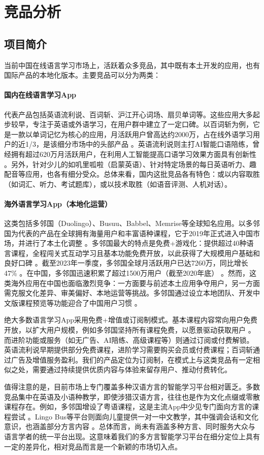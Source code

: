 \section{竞品分析}
\subsection{项目简介}
当前中国在线语言学习市场上，活跃着众多竞品，其中既有本土开发的应用，也有国际产品的本地化版本。主要竞品可以分为两类：
\paragraph{国内在线语言学习App}
代表产品包括英语流利说、百词斩、沪江开心词场、扇贝单词等。这些应用大多起步较早，专注于英语或外语学习，在用户群中建立了一定口碑。以百词斩为例，它是一款以单词记忆为核心的应用，月活跃用户曾高达约2000万，占在线外语学习用户的近1/3，是该细分市场中的头部产品 。英语流利说则主打AI智能口语陪练，曾经拥有超过620万月活跃用户，在利用人工智能提高口语学习效果方面具有创新性 。另外，针对少儿的如叽里呱啦（启蒙英语）、针对特定场景的每日英语听力、趣配音等应用，也各有细分受众。总体来看，国内这批竞品各有特色：或以内容取胜（如词汇、听力、考试题库），或以技术取胜（如语音评测、人机对话）。
\paragraph{海外语言学习App（本地化运营）}
这类包括多邻国（Duolingo）、Busuu、Babbel、Memrise等全球知名应用。以多邻国为代表的产品在全球拥有海量用户和丰富语种课程，它于2019年正式进入中国市场，并进行了本土化调整  。多邻国最大的特点是免费+游戏化：提供超过40种语言课程，全程闯关式互动学习且基本功能免费开放，以此获得了大规模用户基础和良好口碑  。截至2023年一季度，多邻国全球月活跃用户已达7260万，同比增长47\% 。在中国，多邻国迅速积累了超过1500万用户（截至2020年底） 。然而，这类海外应用在中国也面临激烈竞争：一方面要与前述本土应用争夺用户，另一方面需克服文化差异、审美偏好、本地运营等挑战。多邻国通过设立本地团队、开发中文版课程预览等功能迎合了中国用户习惯 。

绝大多数语言学习App采用免费+增值或订阅制模式。基本课程内容常向用户免费开放，以扩大用户规模，例如多邻国坚持所有课程免费，以愿景驱动获取用户 。而进阶功能或服务（如无广告、AI陪练、高级课程等）则通过订阅或付费解锁。英语流利说早期提供部分免费课程，进阶学习需要购买会员或付费课程；百词斩通过广告及增值服务盈利。我们的产品定位为订阅制，在模式上与这类竞品有一定相似之处，需要通过持续提供优质内容与体验来留存用户、推动付费转化。

值得注意的是，目前市场上专门覆盖多种汉语方言的智能学习平台相对匮乏。多数竞品集中在英语及小语种教学，即使涉猎汉语方言，往往也是作为文化点缀或零散课程存在。例如，多邻国增设了粤语课程，这是主流App中少见专门面向方言的课程尝试 。Lingo Bus等平台则面向儿童提供一对一中文教学，其中强调会话和文化意识，也涵盖部分方言内容 。总体而言，尚未有涵盖多种方言、同时服务大众与语言学者的统一平台出现。这意味着我们的多方言智能学习平台在细分定位上具有一定的差异化，相对竞品而言是一个新颖的市场切入点。


